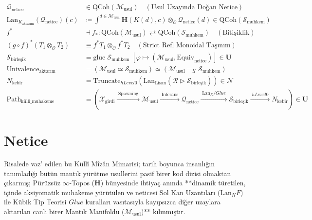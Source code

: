 \documentclass[11pt, a4paper]{article}
\begin{document}
\begin{align}
\mathcal{Q}_{\text{netice}} &\in \text{QCoh}(\mathcal{M}_{\text{usul}}) \quad (\text{Usul Uzayında Doğan Netice}) \\
\text{Lan}_{K_{\text{aktarım}}}(\mathcal{Q}_{\text{netice}})(c) &\coloneqq \int^{d \in \mathcal{M}_{\text{usul}}} \mathbf{H}(K(d), c) \otimes_{\mathcal{O}} \mathcal{Q}_{\text{netice}}(d) \in \text{QCoh}(\mathcal{S}_{\text{muhkem}}) \\
f^* &\dashv f_* : \text{QCoh}(\mathcal{M}_{\text{usul}}) \rightleftarrows \text{QCoh}(\mathcal{S}_{\text{muhkem}}) \quad (\text{Bitişiklik}) \\
(g \circ f)^* (T_1 \otimes_{\mathcal{O}} T_2) &\equiv f^* T_1 \otimes_{\mathcal{O}} f^* T_2 \quad (\text{Strict Refl Monoidal Taşınım}) \\
\mathcal{S}_{\text{birleşik}} &= \text{glue} \; \mathcal{S}_{\text{muhkem}} \; \left[ \varphi \mapsto (\mathcal{M}_{\text{usul}}, \text{Equiv}_{\text{netice}}) \right] \in \mathbf{U} \\
\text{Univalence}_{\text{aktarım}} &= (\mathcal{M}_{\text{usul}} \simeq \mathcal{S}_{\text{muhkem}}) \simeq (\mathcal{M}_{\text{usul}} =_{\mathcal{U}} \mathcal{S}_{\text{muhkem}}) \\
N_{\text{kebîr}} &= \text{Truncate}_{hLevel 0} \left( \text{Lan}_{\text{Lisan}} \left( \mathcal{R} \triangleright \mathcal{S}_{\text{birleşik}} \right) \right) \in \mathcal{N} \\
\text{Path}_{\text{küllî\_muhakeme}} &= \left( \mathcal{X}_{\text{girdi}} \xrightarrow{\;\text{Spawning}\;} \mathcal{M}_{\text{usul}} \xrightarrow{\;\text{İnferans}\;} \mathcal{Q}_{\text{netice}} \xrightarrow{\;\text{Lan}_K / Glue\;} \mathcal{S}_{\text{birleşik}} \xrightarrow{\;hLevel 0\;} N_{\text{kebîr}} \right) \in \mathbf{U}
\end{align}

\section{Netice}

Risalede vaz' edilen bu Küllî Mîzân Mimarisi; tarih boyunca insanlığın tanımladığı bütün mantık yürütme usullerini pasif birer kod dizisi olmaktan çıkarmış; Pürüzsüz $\infty$-Topos ($\mathbf{H}$) bünyesinde ihtiyaç anında **dinamik türetilen, içinde aksiyomatik muhakeme yürütülen ve neticesi Sol Kan Uzantıları ($\text{Lan}_K F$) ile Kübik Tip Teorisi $Glue$ kuralları vasıtasıyla kayıpsızca diğer uzaylara aktarılan canlı birer Mantık Manifoldu ($\mathcal{M}_{\text{usul}}$)** kılınmıştır.
\end{document}
